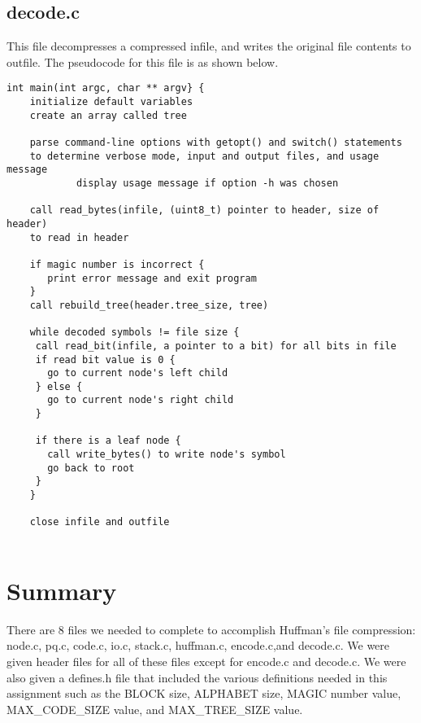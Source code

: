 \documentclass[11pt]{article}
\begin{document}
\subsection{decode.c}
This file decompresses a compressed infile, and writes the original file contents to outfile. The pseudocode for this file is as shown below. 
\begin{verbatim}
int main(int argc, char ** argv} {
    initialize default variables
    create an array called tree
    
    parse command-line options with getopt() and switch() statements
    to determine verbose mode, input and output files, and usage message
            display usage message if option -h was chosen
    
    call read_bytes(infile, (uint8_t) pointer to header, size of header) 
    to read in header
    
    if magic number is incorrect {
       print error message and exit program 
    }
    call rebuild_tree(header.tree_size, tree)
    
    while decoded symbols != file size {
     call read_bit(infile, a pointer to a bit) for all bits in file
     if read bit value is 0 {
       go to current node's left child
     } else {
       go to current node's right child
     } 
    
     if there is a leaf node {
       call write_bytes() to write node's symbol
       go back to root
     }
    }
    
    close infile and outfile
    
\end{verbatim}

\section{Summary}
There are 8 files we needed to complete to accomplish Huffman's file compression: node.c, pq.c, code.c, io.c, stack.c, huffman.c, encode.c,and decode.c. We were given header files for all of these files except for encode.c and decode.c. We were also given a defines.h file that included the various definitions needed in this assignment such as the BLOCK size, ALPHABET size, MAGIC number value, MAX\_CODE\_SIZE value, and MAX\_TREE\_SIZE value.
\end{document}

